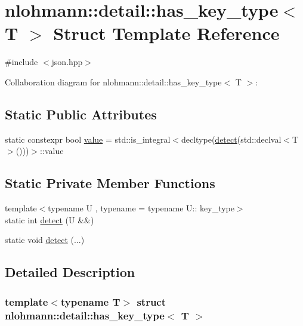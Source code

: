 \hypertarget{structnlohmann_1_1detail_1_1has__key__type}{}\section{nlohmann\+:\+:detail\+:\+:has\+\_\+key\+\_\+type$<$ T $>$ Struct Template Reference}
\label{structnlohmann_1_1detail_1_1has__key__type}


{\ttfamily \#include $<$json.\+hpp$>$}



Collaboration diagram for nlohmann\+:\+:detail\+:\+:has\+\_\+key\+\_\+type$<$ T $>$\+:
\subsection*{Static Public Attributes}
\begin{DoxyCompactItemize}
\item 
static constexpr bool \hyperlink{structnlohmann_1_1detail_1_1has__key__type_a10b4ec56e7a38d678615d95278f6d36f}{value} = std\+::is\+\_\+integral$<$decltype(\hyperlink{structnlohmann_1_1detail_1_1has__key__type_a8387ce16ab3d7c83665265e5d244ccca}{detect}(std\+::declval$<$T$>$()))$>$\+::value
\end{DoxyCompactItemize}
\subsection*{Static Private Member Functions}
\begin{DoxyCompactItemize}
\item 
{\footnotesize template$<$typename U , typename  = typename U\+:: key\+\_\+type$>$ }\\static int \hyperlink{structnlohmann_1_1detail_1_1has__key__type_a8387ce16ab3d7c83665265e5d244ccca}{detect} (U \&\&)
\item 
static void \hyperlink{structnlohmann_1_1detail_1_1has__key__type_a746958442705204d29bca2ecf9414282}{detect} (...)
\end{DoxyCompactItemize}


\subsection{Detailed Description}
\subsubsection*{template$<$typename T$>$\newline
struct nlohmann\+::detail\+::has\+\_\+key\+\_\+type$<$ T $>$}



